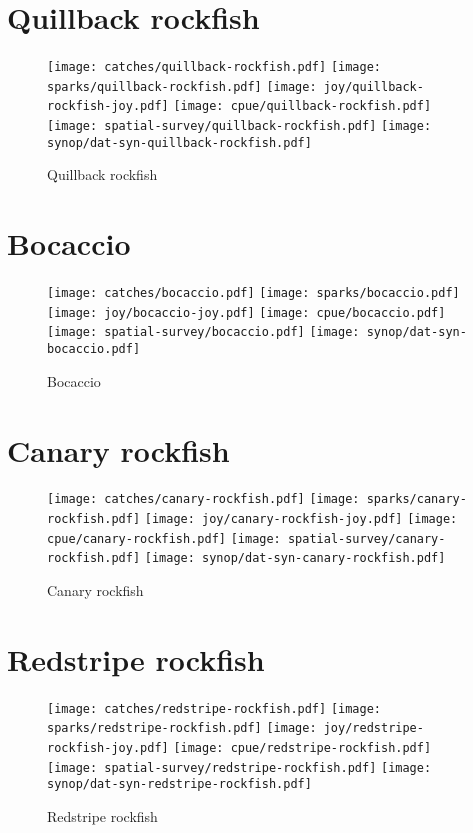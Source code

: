 \section*{Quillback rockfish}

\begin{figure}[htbp]
\centering
\texttt{[image: catches/quillback-rockfish.pdf]}
\texttt{[image: sparks/quillback-rockfish.pdf]}
\texttt{[image: joy/quillback-rockfish-joy.pdf]}
\texttt{[image: cpue/quillback-rockfish.pdf]}
\texttt{[image: spatial-survey/quillback-rockfish.pdf]}
\texttt{[image: synop/dat-syn-quillback-rockfish.pdf]}
\caption{Quillback rockfish}
\end{figure}
\clearpage
\section*{Bocaccio}

\begin{figure}[htbp]
\centering
\texttt{[image: catches/bocaccio.pdf]}
\texttt{[image: sparks/bocaccio.pdf]}
\texttt{[image: joy/bocaccio-joy.pdf]}
\texttt{[image: cpue/bocaccio.pdf]}
\texttt{[image: spatial-survey/bocaccio.pdf]}
\texttt{[image: synop/dat-syn-bocaccio.pdf]}
\caption{Bocaccio}
\end{figure}
\clearpage
\section*{Canary rockfish}

\begin{figure}[htbp]
\centering
\texttt{[image: catches/canary-rockfish.pdf]}
\texttt{[image: sparks/canary-rockfish.pdf]}
\texttt{[image: joy/canary-rockfish-joy.pdf]}
\texttt{[image: cpue/canary-rockfish.pdf]}
\texttt{[image: spatial-survey/canary-rockfish.pdf]}
\texttt{[image: synop/dat-syn-canary-rockfish.pdf]}
\caption{Canary rockfish}
\end{figure}
\clearpage
\section*{Redstripe rockfish}

\begin{figure}[htbp]
\centering
\texttt{[image: catches/redstripe-rockfish.pdf]}
\texttt{[image: sparks/redstripe-rockfish.pdf]}
\texttt{[image: joy/redstripe-rockfish-joy.pdf]}
\texttt{[image: cpue/redstripe-rockfish.pdf]}
\texttt{[image: spatial-survey/redstripe-rockfish.pdf]}
\texttt{[image: synop/dat-syn-redstripe-rockfish.pdf]}
\caption{Redstripe rockfish}
\end{figure}
\clearpage
